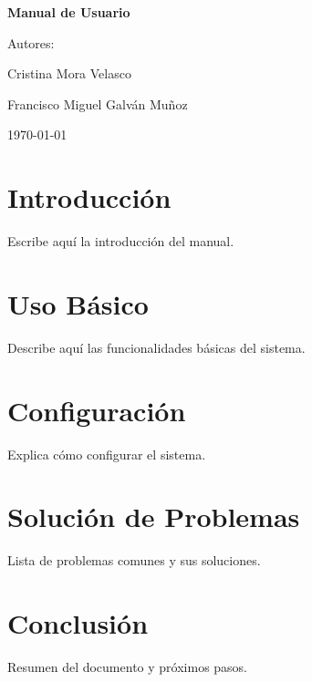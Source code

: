 \documentclass[a4paper,12pt]{article}
\begin{document}
\begin{titlepage}
    \centering
    \vfill
    {\Huge \textbf{Manual de Usuario} \par}
    \vfill
    {\Large Autores:\par Cristina Mora Velasco \par Francisco Miguel Galván Muñoz \par}
    \vfill
    \today
    \vfill
\end{titlepage}

\tableofcontents
\newpage

\section{Introducción}
Escribe aquí la introducción del manual.

\section{Uso Básico}
Describe aquí las funcionalidades básicas del sistema.

\section{Configuración}
Explica cómo configurar el sistema.

\section{Solución de Problemas}
Lista de problemas comunes y sus soluciones.

\section{Conclusión}
Resumen del documento y próximos pasos.
\end{document}
